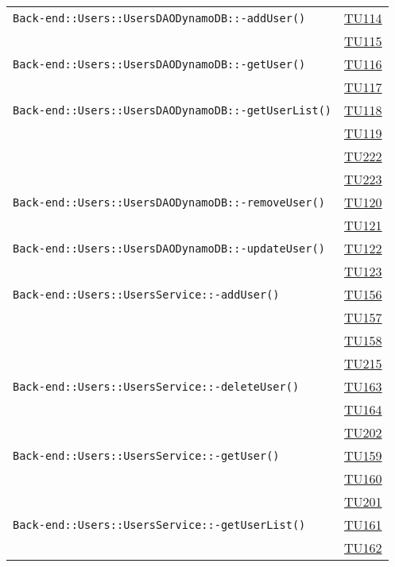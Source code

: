 \begin{longtable}{|>{\centering}m{12cm}|m{1cm}<{\centering}|}
\texttt{Back-end::Users::UsersDAODynamoDB::-\linebreak addUser()} & \hyperlink{TU114}{TU114}\\ & \hyperlink{TU115}{TU115}\\ \hline
\texttt{Back-end::Users::UsersDAODynamoDB::-\linebreak getUser()} & \hyperlink{TU116}{TU116}\\ & \hyperlink{TU117}{TU117}\\ \hline
\texttt{Back-end::Users::UsersDAODynamoDB::-\linebreak getUserList()} & \hyperlink{TU118}{TU118}\\ & \hyperlink{TU119}{TU119}\\ & \hyperlink{TU222}{TU222}\\ & \hyperlink{TU223}{TU223}\\ \hline
\texttt{Back-end::Users::UsersDAODynamoDB::-\linebreak removeUser()} & \hyperlink{TU120}{TU120}\\ & \hyperlink{TU121}{TU121}\\ \hline
\texttt{Back-end::Users::UsersDAODynamoDB::-\linebreak updateUser()} & \hyperlink{TU122}{TU122}\\ & \hyperlink{TU123}{TU123}\\ \hline
\texttt{Back-end::Users::UsersService::-\linebreak addUser()} & \hyperlink{TU156}{TU156}\\ & \hyperlink{TU157}{TU157}\\ & \hyperlink{TU158}{TU158}\\ & \hyperlink{TU215}{TU215}\\ \hline
\texttt{Back-end::Users::UsersService::-\linebreak deleteUser()} & \hyperlink{TU163}{TU163}\\ & \hyperlink{TU164}{TU164}\\ & \hyperlink{TU202}{TU202}\\ \hline
\texttt{Back-end::Users::UsersService::-\linebreak getUser()} & \hyperlink{TU159}{TU159}\\ & \hyperlink{TU160}{TU160}\\ & \hyperlink{TU201}{TU201}\\ \hline
\texttt{Back-end::Users::UsersService::-\linebreak getUserList()} & \hyperlink{TU161}{TU161}\\ & \hyperlink{TU162}{TU162}\\ \hline

\end{longtable}
